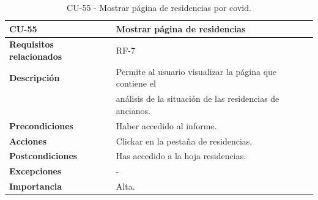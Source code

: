 \begin{table}[ht!]
    \centering
    \resizebox{15cm}{!} {
    \begin{tabular}{|l|l|}
    \hline
         \textbf{CU-55}     &  \textbf{Mostrar página de residencias} \\ \hline
         \textbf{Requisitos relacionados}       & RF-7 \\ \hline
         \textbf{Descripción}    & Permite al usuario visualizar la página que contiene el \\&análisis de la situación de las residencias de ancianos. \\ \hline   
         \textbf{Precondiciones}      & Haber accedido al informe.\\ \hline
         \textbf{Acciones}      & Clickar en la pestaña de residencias.  \\ \hline
         \textbf{Postcondiciones}       & Has accedido a la hoja residencias. \\ \hline
         \textbf{Excepciones}       & - \\ \hline
         \textbf{Importancia}   & Alta. \\
         \hline
    \end{tabular}}
    \caption{CU-55 - Mostrar página de residencias por covid.}
    \label{tab:my_label}
\end{table}

